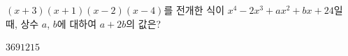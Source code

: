 $(x+3)(x+1)(x-2)(x-4)$를 전개한 식이 $x^4-2x^3+ax^2+bx+24$일 때, 상수 $a$, $b$에 대하여 $a+2b$의 값은?
\begin{choices32}{$3$}{$6$}{$9$}{$12$}{$15$}\end{choices32}
